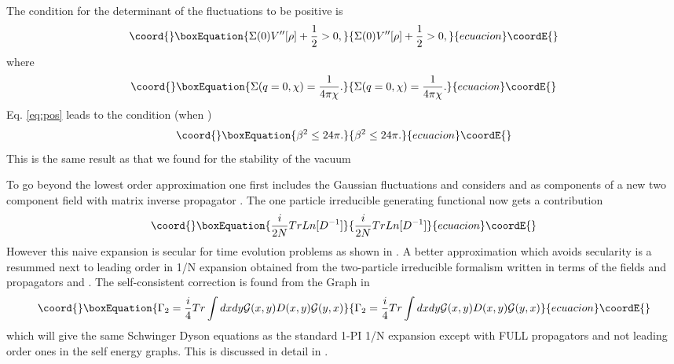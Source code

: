 \documentclass[a4paper,prd,preprint,superscriptaddress,showpacs,byrevtex]{revtex4}
\begin{document}
The condition for the determinant of the fluctuations to be positive is 
\begin{equation}\coord{}\boxEquation{
\Sigma(0) V^{\prime \prime} [\rho] + \frac{1}{2}  >0, \label{eq:pos}
}{
\Sigma(0) V^{\prime \prime} [\rho] + \frac{1}{2}  >0, }{ecuacion}\coordE{}\end{equation}
where
\begin{equation}\coord{}\boxEquation{
\Sigma(q=0,\chi) = \frac{1}{4 \pi \chi}.
}{
\Sigma(q=0,\chi) = \frac{1}{4 \pi \chi}.
}{ecuacion}\coordE{}\end{equation}
Eq. \ref{eq:pos} leads to the condition (when \coordHE{}) 
\begin{equation}\coord{}\boxEquation{
\beta^2  \leq 24 \pi.
}{
\beta^2  \leq 24 \pi.
}{ecuacion}\coordE{}\end{equation}
This is the same result as that we found for the stability of the vacuum 

To go beyond the lowest order approximation one first includes the Gaussian
fluctuations and
considers \myHighlight{$\rho$}\coordHE{} and  \myHighlight{$\chi$}\coordHE{} as components of a new two component field with
matrix inverse propagator \coordHE{}.
The one particle irreducible generating functional now gets a contribution
\begin{equation}\coord{}\boxEquation{
\frac{i}{2 N} Tr Ln[D^{-1}]
}{
\frac{i}{2 N} Tr Ln[D^{-1}]
}{ecuacion}\coordE{}\end{equation}
However this naive \coordHE{} expansion is secular for time evolution problems as
shown in \cite{ref:Bogdan}.  A better approximation which avoids secularity
is a resummed next to leading order
in 1/N expansion obtained from the two-particle
irreducible formalism \cite{ref:CJT} written in terms of the fields
\myHighlight{$\phi,\chi,\rho$}\coordHE{} and propagators \coordHE{} and \coordHE{}. The  self-consistent
\coordHE{} correction is found from the Graph in \coordHE{}
\begin{equation}\coord{}\boxEquation{ \Gamma_2= \frac{i}{4} Tr \int dx dy  {\cal G}(x,y) D(x,y)
{\cal G}(y,x) }{ \Gamma_2= \frac{i}{4} Tr \int dx dy  {\cal G}(x,y) D(x,y)
{\cal G}(y,x) }{ecuacion}\coordE{}\end{equation} which will give the same Schwinger Dyson
equations
as the standard 1-PI 1/N  expansion except with FULL propagators and not
leading order ones in the self energy graphs.  This is discussed in detail
in \cite{ref:dawson} \cite{ref:berges}.
\end{document}

